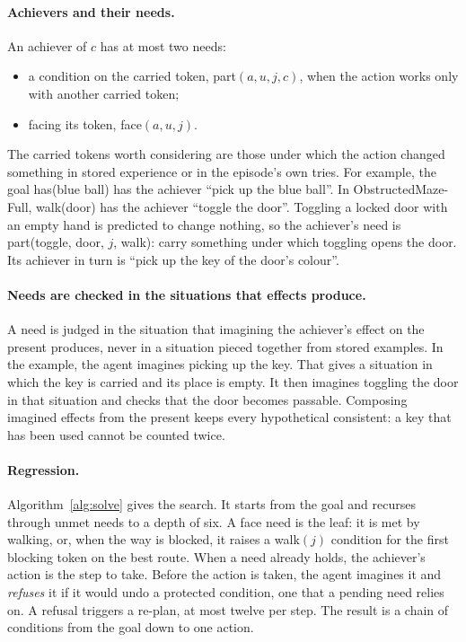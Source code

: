 \documentclass{article}
\newcommand{\cond}[1]{\textsf{#1}}
\begin{document}
\paragraph{Achievers and their needs.} An achiever of $c$ has at most two needs:
\begin{itemize}
    \item a condition on the carried token, \cond{part}$(a,u,j,c)$, when the action works only with another carried token;
    \item facing its token, \cond{face}$(a,u,j)$.
\end{itemize}
The carried tokens worth considering are those under which the action changed something in stored experience or in the episode's own tries. For example, the goal \cond{has}(blue ball) has the achiever ``pick up the blue ball''. In ObstructedMaze-Full, \cond{walk}(door) has the achiever ``toggle the door''. Toggling a locked door with an empty hand is predicted to change nothing, so the achiever's need is \cond{part}(toggle, door, $j$, \cond{walk}): carry something under which toggling opens the door. Its achiever in turn is ``pick up the key of the door's colour''.

\paragraph{Needs are checked in the situations that effects produce.} A need is judged in the situation that imagining the achiever's effect on the present produces, never in a situation pieced together from stored examples. In the example, the agent imagines picking up the key. That gives a situation in which the key is carried and its place is empty. It then imagines toggling the door in that situation and checks that the door becomes passable. Composing imagined effects from the present keeps every hypothetical consistent: a key that has been used cannot be counted twice.

\paragraph{Regression.} Algorithm~\ref{alg:solve} gives the search. It starts from the goal and recurses through unmet needs to a depth of six. A \cond{face} need is the leaf: it is met by walking, or, when the way is blocked, it raises a \cond{walk}$(j)$ condition for the first blocking token on the best route. When a need already holds, the achiever's action is the step to take. Before the action is taken, the agent imagines it and \emph{refuses} it if it would undo a protected condition, one that a pending need relies on. A refusal triggers a re-plan, at most twelve per step. The result is a chain of conditions from the goal down to one action.
\end{document}
